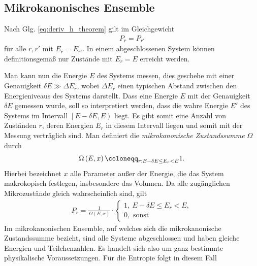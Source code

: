 \documentclass{book}
\let\sum\relax
\DeclareMathOperator*{\sum}{\raisebox{-3.5pt}{\scalebox{2}{\rotatebox{1}{{\bask Σ}}}}}
\begin{document}
\subsection{Mikrokanonisches Ensemble}
\label{sec:mikrokanonisches_ensemble}

Nach Glg. \eqref{eq:deriv_h_theorem} gilt im Gleichgewicht
%
\begin{eqnarray}
P_{r} = P_{r'}
\end{eqnarray}
%
für alle $r, r'$ mit $E_r = E_{r'}$. In einem abgeschlossenen System können definitionsgemäß nur Zustände mit $E_r = E$ erreicht werden.
%
\begin{center}
\end{center}
%
Man kann nun die Energie $E$ des Systems messen, dies geschehe mit einer Genauigkeit $\delta E\gg \Delta E_r$, wobei $\Delta E_r$ einen typischen Abstand zwischen den Energieniveaus des Systems darstellt. Dass eine Energie $E$ mit der Genauigkeit $\delta E$ gemessen wurde, soll so interpretiert werden, dass die wahre Energie $E'$ des Systems im Intervall $\left[E - \delta E, E\right)$ liegt. Es gibt somit eine Anzahl von Zuständen $r$, deren Energien $E_r$ in diesem Intervall liegen und somit mit der Messung verträglich sind. Man definiert die \textit{mikrokanonische Zustandssumme} $\Omega$ durch
%
\begin{eqnarray}
\Omega\left(E, x\right) \coloneqq \sum_{r:E - \delta E\leq E_r< E}^{}1.
\end{eqnarray}
%
Hierbei bezeichnet $x$ alle Parameter außer der Energie, die das System makrokopisch festlegen, insbesondere das Volumen. Da alle zugänglichen Mikrozustände gleich wahrscheinlich sind, gilt
%
\begin{eqnarray}
P_r = \frac{1}{\Omega\left(E, x\right)}\cdot\begin{cases}
1, \:E - \delta E\leq E_r < E,\\
0, \text{ sonst}
\end{cases}\label{eq:mikrokan_ens}
\end{eqnarray}
%
Im mikrokanonischen Ensemble, auf welches sich die mikrokanonische Zustandssumme bezieht, sind alle Systeme abgeschlossen und haben gleiche Energien und Teilchenzahlen. Es handelt sich also um ganz bestimmte physikalische Voraussetzungen. Für die Entropie folgt in diesem Fall
\end{document}
